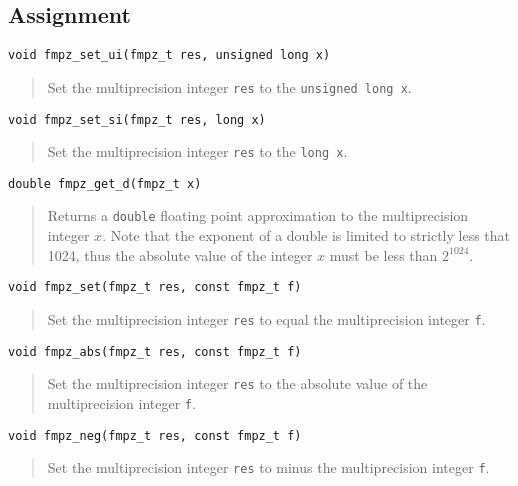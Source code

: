 \documentclass[a4paper,10pt]{article}
\newcommand{\code}{\lstinline}
\begin{document}
\subsection{Assignment}

\begin{lstlisting}
void fmpz_set_ui(fmpz_t res, unsigned long x)
\end{lstlisting}
\begin{quote}
Set the multiprecision integer \code{res} to the \code{unsigned long x}.
\end{quote}

\begin{lstlisting}
void fmpz_set_si(fmpz_t res, long x)
\end{lstlisting}
\begin{quote}
Set the multiprecision integer \code{res} to the \code{long x}.
\end{quote}

\begin{lstlisting}
double fmpz_get_d(fmpz_t x) 
\end{lstlisting}
\begin{quote}
Returns a \code{double} floating point approximation to the multiprecision integer $x$. Note that the exponent of a double is limited to strictly less that 1024, thus the absolute value of the integer $x$ must be less than $2^1024$.
\end{quote}

\begin{lstlisting}
void fmpz_set(fmpz_t res, const fmpz_t f)
\end{lstlisting}
\begin{quote}
Set the multiprecision integer \code{res} to equal the multiprecision integer \code{f}.
\end{quote}

\begin{lstlisting}
void fmpz_abs(fmpz_t res, const fmpz_t f)
\end{lstlisting}
\begin{quote}
Set the multiprecision integer \code{res} to the absolute value of the multiprecision integer \code{f}.
\end{quote}

\begin{lstlisting}
void fmpz_neg(fmpz_t res, const fmpz_t f)
\end{lstlisting}
\begin{quote}
Set the multiprecision integer \code{res} to minus the multiprecision integer \code{f}.
\end{quote}
\end{document}
